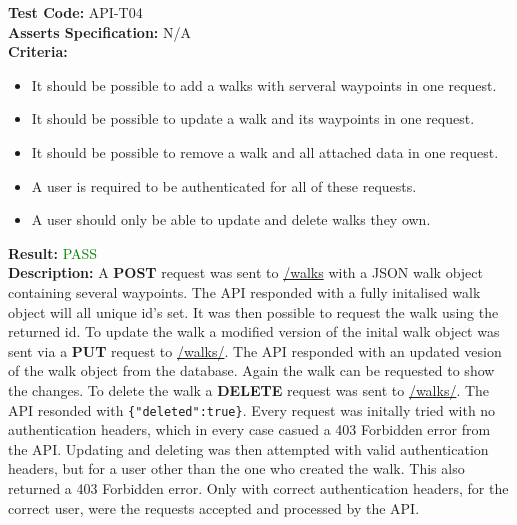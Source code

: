 \documentclass[11pt,a4paper]{report}
\begin{document}
\label{test:API-T04}
\noindent\textbf{Test Code:} API-T04\\
\textbf{Asserts Specification:} N/A \\ 
\textbf{Criteria:} \begin{itemize}
                     \item It should be possible to add a walks with serveral waypoints in one request.
                     \item It should be possible to update a walk and its waypoints in one request.
                     \item It should be possible to remove a walk and all attached data in one request.
                     \item A user is required to be authenticated for all of these requests.
                     \item A user should only be able to update and delete walks they own. 
                   \end{itemize}  
\textbf{Result:} \textcolor{green}{PASS}\\ 
\textbf{Description:} A \textbf{POST} request was sent to \url{/walks} with a JSON walk object containing several waypoints. The API responded with a fully initalised walk object will all unique id's set. It was then possible to request the walk using the returned id. To update the walk a modified version of the inital walk object was sent via a \textbf{PUT} request to \url{/walks/}. The API responded with an updated vesion of the walk object from the database. Again the walk can be requested to show the changes. To delete the walk a \textbf{DELETE} request was sent to \url{/walks/}. The API resonded with \lstinline${"deleted":true}$. Every request was initally tried with no authentication headers, which in every case casued a 403 Forbidden error from the API. Updating and deleting was then attempted with valid authentication headers, but for a user other than the one who created the walk. This also returned a 403 Forbidden error. Only with correct authentication headers, for the correct user, were the requests accepted and processed by the API.\\
\end{document}
